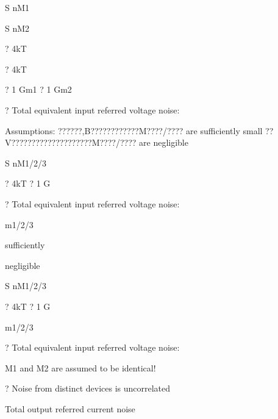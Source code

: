 \documentclass[2pt,landscape]{article}
\begin{document}
\begin{multicols*}{5}
S
nM1



S
nM2


? 4kT

? 4kT


?	1
Gm1
?	1
Gm2




?	Total equivalent input referred voltage noise:





Assumptions:
\textbullet 	??????,B????????????M????/????  are 
sufficiently small
\textbullet 	??V????????????????????M????/????  are 
negligible



S
nM1/2/3


? 4kT ?	1
G




?	Total equivalent input referred voltage noise:


m1/2/3









sufficiently

negligible



S
nM1/2/3


? 4kT ?	1
G


m1/2/3









?	Total equivalent input referred voltage noise:
























M1 and M2 are assumed 
to be identical!


?	Noise from distinct devices is uncorrelated








Total output referred current noise




\end{multicols*}
\end{document}
